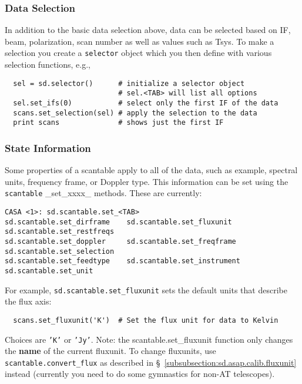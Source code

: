 \subsubsection{Data Selection}
\label{subsubsection:sd.asap.scantable.select}

In addition to the basic data selection above, data can be selected
based on IF, beam, polarization, scan number as well as values such as
Tsys.  To make a selection you create a {\tt selector} object which
you then define with various selection functions, e.g.,

\small
\begin{verbatim}
  sel = sd.selector()      # initialize a selector object
                           # sel.<TAB> will list all options
  sel.set_ifs(0)           # select only the first IF of the data
  scans.set_selection(sel) # apply the selection to the data
  print scans              # shows just the first IF
\end{verbatim}
\normalsize

\subsubsection{State Information}
\label{subsubsection:sd.asap.scantable.state}

Some properties of a scantable apply to all of the data, such as
example, spectral units, frequency frame, or Doppler type. This
information can be set using the {\tt scantable} \_set\_xxxx\_
methods.  These are currently:
\small
\begin{verbatim}
CASA <1>: sd.scantable.set_<TAB>
sd.scantable.set_dirframe    sd.scantable.set_fluxunit    sd.scantable.set_restfreqs   
sd.scantable.set_doppler     sd.scantable.set_freqframe   sd.scantable.set_selection   
sd.scantable.set_feedtype    sd.scantable.set_instrument  sd.scantable.set_unit
\end{verbatim}
\normalsize

For example, {\tt sd.scantable.set\_fluxunit} sets the default units
that describe the flux axis:
\small
\begin{verbatim}
  scans.set_fluxunit('K')  # Set the flux unit for data to Kelvin
\end{verbatim}
\normalsize
Choices are {\tt 'K'} or {\tt 'Jy'}.
Note: the scantable.set\_fluxunit function only changes the {\bf name}
of the current fluxunit. To change fluxunits, use 
{\tt scantable.convert\_flux} as described in 
\S~\ref{subsubsection:sd.asap.calib.fluxunit}
instead (currently you need to do some gymnastics for non-AT
telescopes).

